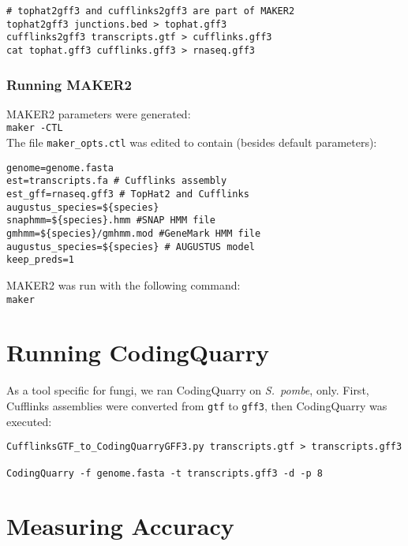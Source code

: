 \documentclass[a4paper,10pt]{report}
\begin{document}
\begin{verbatim}
# tophat2gff3 and cufflinks2gff3 are part of MAKER2
tophat2gff3 junctions.bed > tophat.gff3
cufflinks2gff3 transcripts.gtf > cufflinks.gff3
cat tophat.gff3 cufflinks.gff3 > rnaseq.gff3
\end{verbatim}


\subsubsection{Running MAKER2}

MAKER2 parameters were generated:\\

\noindent \texttt{maker -CTL}\\

\noindent The file \texttt{maker\_opts.ctl} was edited to contain (besides default parameters):

\begin{verbatim}
genome=genome.fasta
est=transcripts.fa # Cufflinks assembly
est_gff=rnaseq.gff3 # TopHat2 and Cufflinks
augustus_species=${species}
snaphmm=${species}.hmm #SNAP HMM file
gmhmm=${species}/gmhmm.mod #GeneMark HMM file
augustus_species=${species} # AUGUSTUS model
keep_preds=1
\end{verbatim}

\noindent MAKER2 was run with the following command:\\

\noindent \texttt{maker}\\

\section{Running CodingQuarry}

As a tool specific for fungi, we ran CodingQuarry on \textit{S.~pombe}, only. First, Cufflinks assemblies were converted from \texttt{gtf} to \texttt{gff3}, then CodingQuarry was executed:

\begin{verbatim}
CufflinksGTF_to_CodingQuarryGFF3.py transcripts.gtf > transcripts.gff3

CodingQuarry -f genome.fasta -t transcripts.gff3 -d -p 8
\end{verbatim}


\section{Measuring Accuracy}
\end{document}

